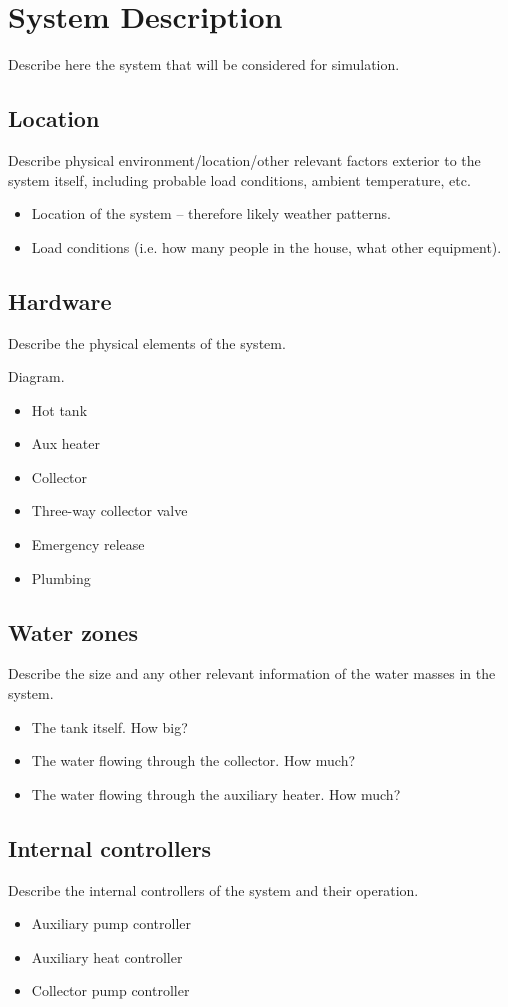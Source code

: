\chapter{System Description}
\label{ch:system}


Describe here the system that will be considered for simulation.

\section{Location}

Describe physical environment/location/other relevant factors exterior to the system itself, including probable load conditions, ambient temperature, etc.

\begin{itemize}
	\item Location of the system -- therefore likely weather patterns.
	\item Load conditions (i.e. how many people in the house, what other equipment).
\end{itemize}

\section{Hardware}

Describe the physical elements of the system.

Diagram.

\begin{itemize}
	\item Hot tank
	\item Aux heater
	\item Collector
	\item Three-way collector valve
	\item Emergency release
	\item Plumbing
\end{itemize}

\section{Water zones}

Describe the size and any other relevant information of the water masses in the system.

\begin{itemize}
	\item The tank itself. How big?
	\item The water flowing through the collector. How much?
	\item The water flowing through the auxiliary heater. How much?
\end{itemize}

\section{Internal controllers}

Describe the internal controllers of the system and their operation.

\begin{itemize}
	\item Auxiliary pump controller
	\item Auxiliary heat controller
	\item Collector pump controller
\end{itemize}
